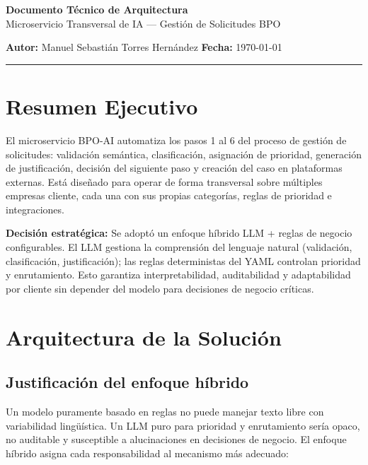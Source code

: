 \documentclass[9pt,letterpaper]{article}
\begin{document}
{\large \textbf{Documento Técnico de Arquitectura}} \\[-2pt]
{\small Microservicio Transversal de IA --- Gestión de Solicitudes BPO}

\vspace{0.2cm}
\textbf{Autor:} Manuel Sebastián Torres Hernández \hfill \textbf{Fecha:} \today
\vspace{0.3cm}
\textcolor{primary}{\rule{\textwidth}{1pt}}
\vspace{-0.8cm}

\section{Resumen Ejecutivo}

El microservicio BPO-AI automatiza los pasos 1 al 6 del proceso de gestión de solicitudes: validación semántica, clasificación, asignación de prioridad, generación de justificación, decisión del siguiente paso y creación del caso en plataformas externas. Está diseñado para operar de forma transversal sobre múltiples empresas cliente, cada una con sus propias categorías, reglas de prioridad e integraciones.

\begin{highlightbox}
\textbf{Decisión estratégica:} Se adoptó un enfoque híbrido LLM + reglas de negocio configurables. El LLM gestiona la comprensión del lenguaje natural (validación, clasificación, justificación); las reglas deterministas del YAML controlan prioridad y enrutamiento. Esto garantiza interpretabilidad, auditabilidad y adaptabilidad por cliente sin depender del modelo para decisiones de negocio críticas.
\end{highlightbox}
\vspace{-0.2cm}
\section{Arquitectura de la Solución}

\subsection{Justificación del enfoque híbrido}

Un modelo puramente basado en reglas no puede manejar texto libre con variabilidad lingüística. Un LLM puro para prioridad y enrutamiento sería opaco, no auditable y susceptible a alucinaciones en decisiones de negocio. El enfoque híbrido asigna cada responsabilidad al mecanismo más adecuado:
\end{document}
